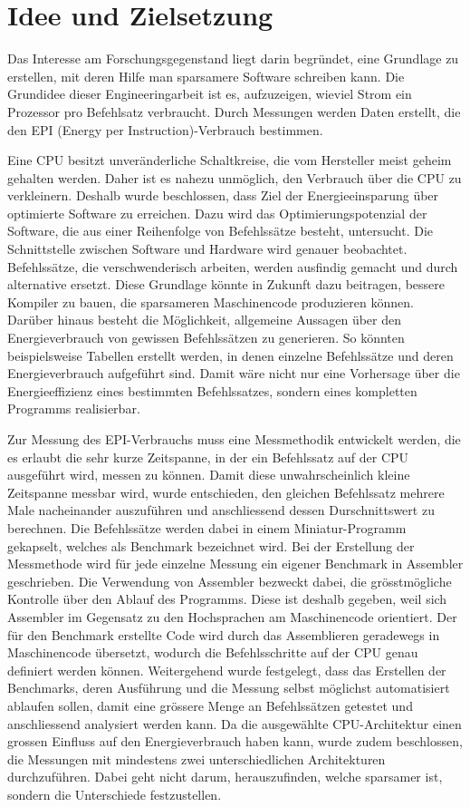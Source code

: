 \chapter{Idee und Zielsetzung}



Das Interesse am Forschungsgegenstand liegt darin begründet, eine Grundlage zu erstellen, mit deren Hilfe man sparsamere Software schreiben kann. Die Grundidee dieser Engineeringarbeit ist es, aufzuzeigen, wieviel Strom ein Prozessor pro Befehlsatz verbraucht. Durch Messungen werden Daten erstellt, die den EPI (Energy per Instruction)-Verbrauch bestimmen.
\par 
Eine CPU besitzt unveränderliche Schaltkreise, die vom Hersteller meist geheim gehalten werden. Daher ist es nahezu unmöglich, den Verbrauch über die CPU zu verkleinern. Deshalb wurde beschlossen, dass Ziel der Energieeinsparung über optimierte Software zu erreichen. Dazu wird das Optimierungspotenzial der Software, die aus einer Reihenfolge von Befehlssätze besteht, untersucht. Die Schnittstelle zwischen Software und Hardware wird genauer beobachtet. Befehlssätze, die verschwenderisch arbeiten, werden ausfindig gemacht und durch alternative ersetzt. Diese Grundlage könnte in Zukunft dazu beitragen, bessere Kompiler zu bauen, die sparsameren Maschinencode produzieren können. Darüber hinaus besteht die Möglichkeit, allgemeine Aussagen über den Energieverbrauch von gewissen Befehlssätzen zu generieren. So könnten beispielsweise Tabellen erstellt werden, in denen einzelne Befehlssätze und deren Energieverbrauch aufgeführt sind. Damit wäre nicht nur eine Vorhersage über die Energieeffizienz eines bestimmten Befehlssatzes, sondern eines kompletten Programms realisierbar.  
\par
Zur Messung des EPI-Verbrauchs muss eine Messmethodik entwickelt werden, die es erlaubt die sehr kurze Zeitspanne, in der ein Befehlssatz auf der CPU ausgeführt wird, messen zu können. Damit diese unwahrscheinlich kleine Zeitspanne messbar wird, wurde entschieden, den gleichen Befehlssatz mehrere Male nacheinander auszuführen und anschliessend dessen Durschnittswert zu berechnen. Die Befehlssätze werden dabei in einem Miniatur-Programm gekapselt, welches als Benchmark bezeichnet wird. Bei der Erstellung der Messmethode wird für jede einzelne Messung ein eigener Benchmark in Assembler geschrieben. Die Verwendung von Assembler bezweckt dabei, die grösstmögliche Kontrolle über den Ablauf des Programms. Diese ist deshalb gegeben, weil sich Assembler im Gegensatz zu den Hochsprachen am Maschinencode orientiert. Der für den Benchmark erstellte Code wird durch das Assemblieren geradewegs in Maschinencode übersetzt, wodurch die Befehlsschritte auf der CPU genau definiert werden können. Weitergehend wurde festgelegt, dass das Erstellen der Benchmarks, deren Ausführung und die Messung selbst möglichst automatisiert ablaufen sollen, damit eine grössere Menge an Befehlssätzen getestet und anschliessend analysiert werden kann. Da die ausgewählte CPU-Architektur einen grossen Einfluss auf den Energieverbrauch haben kann, wurde zudem beschlossen, die Messungen mit mindestens zwei unterschiedlichen Architekturen durchzuführen. Dabei geht nicht darum, herauszufinden, welche sparsamer ist, sondern die Unterschiede festzustellen. 

